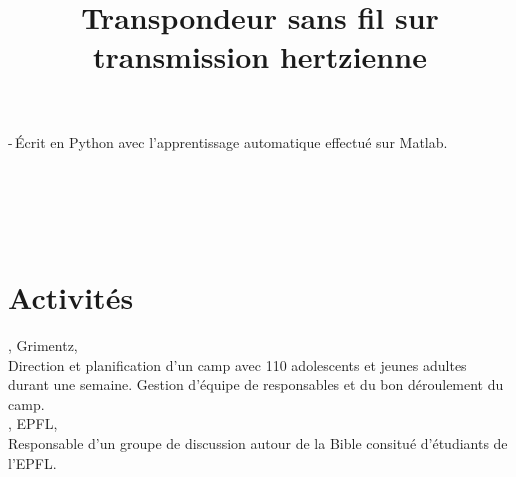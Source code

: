 \documentclass[mm]{simple_style}
\begin{document}
\begin{resume}
\begin{project}
{	-\,\'Ecrit en Python avec l’apprentissage automatique effectu\'e sur Matlab.\\
  }\\
\end{project}
\begin{project}
  \title{Transpondeur sans fil sur transmission hertzienne}
  \\
\end{project}\\
\sectionline

\section{Activit\'es}
, Grimentz, \\
Direction et planification d’un camp avec 110 adolescents et jeunes adultes durant une semaine. Gestion d'\'equipe de responsables et du bon d\'eroulement du camp.\\
, EPFL, \\
Responsable d'un groupe de discussion autour de la Bible consitu\'e d'\'etudiants de l'EPFL.


\end{resume}
\end{document}
